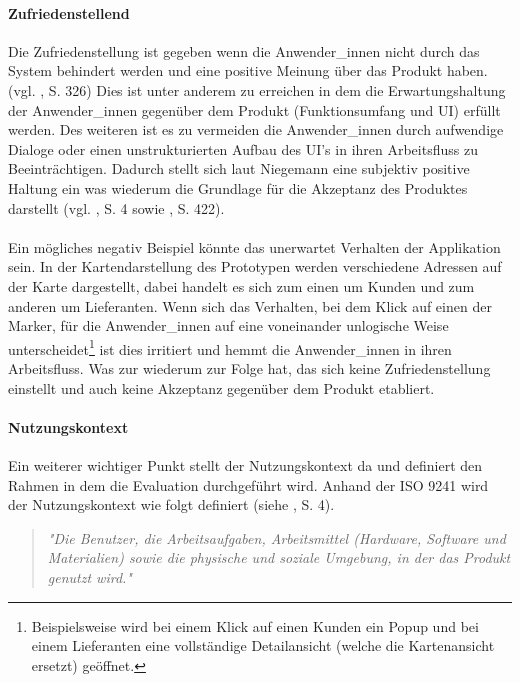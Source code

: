 \documentclass[Bachelorarbeit.tex]{subfiles}
\begin{document}
\paragraph{Zufriedenstellend}
Die Zufriedenstellung ist gegeben wenn die Anwender\_innen nicht durch das System behindert werden und eine positive Meinung über das Produkt haben. (vgl. \cite{Burmester}, S. 326)
Dies ist unter anderem zu erreichen in dem die Erwartungshaltung der Anwender\_innen gegenüber dem Produkt (Funktionsumfang und \ac{UI}) erfüllt werden.
Des weiteren ist es zu vermeiden  die Anwender\_innen durch aufwendige Dialoge oder einen unstrukturierten Aufbau des \ac{UI}'s in ihren Arbeitsfluss zu Beeinträchtigen.
Dadurch stellt sich laut Niegemann eine subjektiv positive Haltung ein was wiederum die Grundlage für die Akzeptanz des Produktes darstellt (vgl. \cite{Iso9241_11}, S. 4 sowie \cite{Niegemann2008}, S. 422).\\
\\
Ein mögliches negativ Beispiel könnte das unerwartet Verhalten der Applikation sein.
In der Kartendarstellung des Prototypen werden verschiedene Adressen auf der Karte dargestellt, dabei handelt es sich zum einen um Kunden und zum anderen um Lieferanten. 
Wenn sich das Verhalten, bei dem Klick auf einen der Marker, für die Anwender\_innen auf eine voneinander unlogische Weise unterscheidet\footnote{Beispielsweise wird bei einem Klick auf einen Kunden ein Popup  und bei einem Lieferanten eine vollständige Detailansicht (welche die Kartenansicht ersetzt) geöffnet.} ist dies irritiert und hemmt die Anwender\_innen in ihren Arbeitsfluss.
Was zur wiederum zur Folge hat, das sich keine Zufriedenstellung einstellt und auch keine Akzeptanz gegenüber dem Produkt etabliert.


\paragraph{Nutzungskontext}

Ein weiterer wichtiger Punkt stellt der Nutzungskontext da und definiert den Rahmen in dem die Evaluation durchgeführt wird.
Anhand der ISO 9241 wird der Nutzungskontext wie folgt definiert (siehe \cite{Iso9241_11}, S. 4). 

\begin{quote}
\textit{"Die Benutzer, die Arbeitsaufgaben, Arbeitsmittel (Hardware, Software und Materialien) sowie die physische und soziale Umgebung, in der das Produkt genutzt wird."}
\end{quote} 
\end{document}
